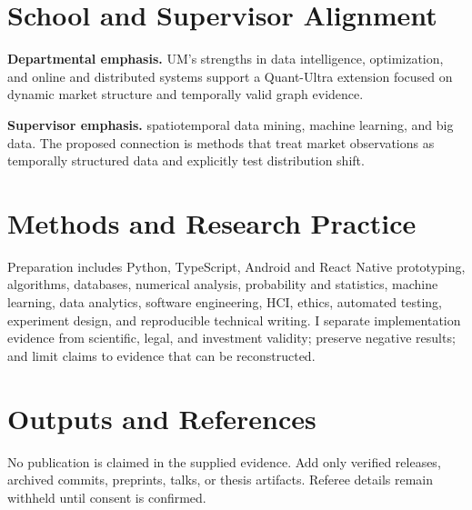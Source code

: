 \documentclass[11pt]{article}
\begin{document}
\section*{School and Supervisor Alignment}
\textbf{Departmental emphasis.} UM's strengths in data intelligence, optimization, and online and distributed systems support a Quant-Ultra extension focused on dynamic market structure and temporally valid graph evidence.

\textbf{Supervisor emphasis.} spatiotemporal data mining, machine learning, and big data. The proposed connection is methods that treat market observations as temporally structured data and explicitly test distribution shift.

\section*{Methods and Research Practice}
Preparation includes Python, TypeScript, Android and React Native prototyping, algorithms, databases, numerical analysis, probability and statistics, machine learning, data analytics, software engineering, HCI, ethics, automated testing, experiment design, and reproducible technical writing. I separate implementation evidence from scientific, legal, and investment validity; preserve negative results; and limit claims to evidence that can be reconstructed.

\section*{Outputs and References}
No publication is claimed in the supplied evidence. Add only verified releases, archived commits, preprints, talks, or thesis artifacts. Referee details remain withheld until consent is confirmed.
\end{document}
